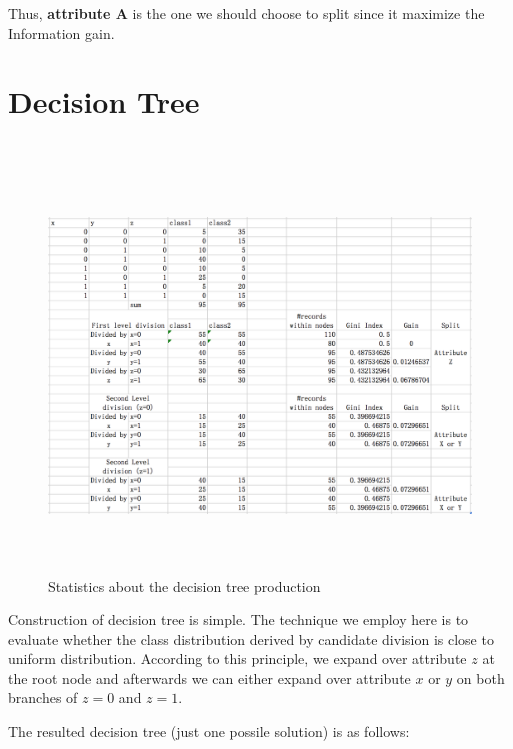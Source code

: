 \documentclass[11pt,a4paper]{article}
\begin{document}
 Thus, \textbf{attribute A} is the one we should choose to split since it maximize the
Information gain.

\newpage

\section{Decision Tree}
\\
\begin{figure}[h]
    \centering
    \includegraphics[width=5in,height=4in]{./section3.png} \\
    \caption{Statistics about the decision tree production}
\end{figure}

Construction of decision tree is simple. The technique we employ here is to
evaluate whether the class distribution derived by candidate division is close
to uniform distribution. According to this principle, we expand over attribute
$z$ at the root node and afterwards we can either expand over attribute $x$ or
$y$ on both branches of $z=0$ and $z=1$.  

The resulted decision tree (just one possile solution) is as follows:
\end{document}
